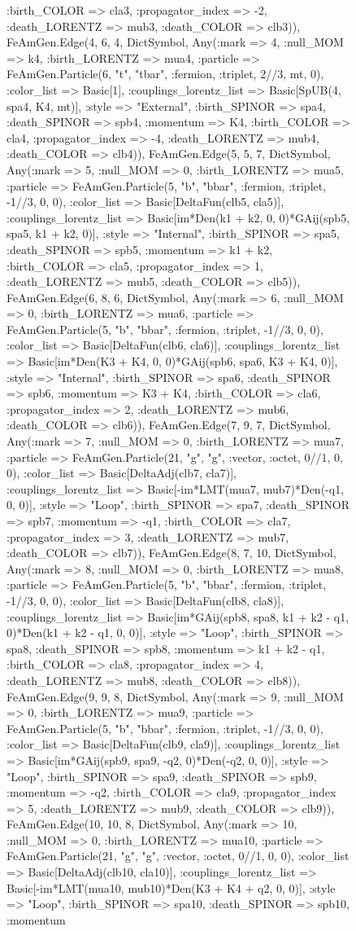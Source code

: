 \documentclass{revtex4}
\begin{document}
\begin{figure}[!htb]
\begin{center}
{:birth_COLOR => cla3, :propagator_index => -2, :death_LORENTZ => mub3, :death_COLOR => clb3)), FeAmGen.Edge(4, 6, 4, Dict{Symbol, Any}(:mark => 4, :null_MOM => k4, :birth_LORENTZ => mua4, :particle => FeAmGen.Particle(6, "t", "tbar", :fermion, :triplet, 2//3, mt, 0), :color_list => Basic[1], :couplings_lorentz_list => Basic[SpUB(4, spa4, K4, mt)], :style => "External", :birth_SPINOR => spa4, :death_SPINOR => spb4, :momentum => K4, :birth_COLOR => cla4, :propagator_index => -4, :death_LORENTZ => mub4, :death_COLOR => clb4)), FeAmGen.Edge(5, 5, 7, Dict{Symbol, Any}(:mark => 5, :null_MOM => 0, :birth_LORENTZ => mua5, :particle => FeAmGen.Particle(5, "b", "bbar", :fermion, :triplet, -1//3, 0, 0), :color_list => Basic[DeltaFun(clb5, cla5)], :couplings_lorentz_list => Basic[im*Den(k1 + k2, 0, 0)*GAij(spb5, spa5, k1 + k2, 0)], :style => "Internal", :birth_SPINOR => spa5, :death_SPINOR => spb5, :momentum => k1 + k2, :birth_COLOR => cla5, :propagator_index => 1, :death_LORENTZ => mub5, :death_COLOR => clb5)), FeAmGen.Edge(6, 8, 6, Dict{Symbol, Any}(:mark => 6, :null_MOM => 0, :birth_LORENTZ => mua6, :particle => FeAmGen.Particle(5, "b", "bbar", :fermion, :triplet, -1//3, 0, 0), :color_list => Basic[DeltaFun(clb6, cla6)], :couplings_lorentz_list => Basic[im*Den(K3 + K4, 0, 0)*GAij(spb6, spa6, K3 + K4, 0)], :style => "Internal", :birth_SPINOR => spa6, :death_SPINOR => spb6, :momentum => K3 + K4, :birth_COLOR => cla6, :propagator_index => 2, :death_LORENTZ => mub6, :death_COLOR => clb6)), FeAmGen.Edge(7, 9, 7, Dict{Symbol, Any}(:mark => 7, :null_MOM => 0, :birth_LORENTZ => mua7, :particle => FeAmGen.Particle(21, "g", "g", :vector, :octet, 0//1, 0, 0), :color_list => Basic[DeltaAdj(clb7, cla7)], :couplings_lorentz_list => Basic[-im*LMT(mua7, mub7)*Den(-q1, 0, 0)], :style => "Loop", :birth_SPINOR => spa7, :death_SPINOR => spb7, :momentum => -q1, :birth_COLOR => cla7, :propagator_index => 3, :death_LORENTZ => mub7, :death_COLOR => clb7)), FeAmGen.Edge(8, 7, 10, Dict{Symbol, Any}(:mark => 8, :null_MOM => 0, :birth_LORENTZ => mua8, :particle => FeAmGen.Particle(5, "b", "bbar", :fermion, :triplet, -1//3, 0, 0), :color_list => Basic[DeltaFun(clb8, cla8)], :couplings_lorentz_list => Basic[im*GAij(spb8, spa8, k1 + k2 - q1, 0)*Den(k1 + k2 - q1, 0, 0)], :style => "Loop", :birth_SPINOR => spa8, :death_SPINOR => spb8, :momentum => k1 + k2 - q1, :birth_COLOR => cla8, :propagator_index => 4, :death_LORENTZ => mub8, :death_COLOR => clb8)), FeAmGen.Edge(9, 9, 8, Dict{Symbol, Any}(:mark => 9, :null_MOM => 0, :birth_LORENTZ => mua9, :particle => FeAmGen.Particle(5, "b", "bbar", :fermion, :triplet, -1//3, 0, 0), :color_list => Basic[DeltaFun(clb9, cla9)], :couplings_lorentz_list => Basic[im*GAij(spb9, spa9, -q2, 0)*Den(-q2, 0, 0)], :style => "Loop", :birth_SPINOR => spa9, :death_SPINOR => spb9, :momentum => -q2, :birth_COLOR => cla9, :propagator_index => 5, :death_LORENTZ => mub9, :death_COLOR => clb9)), FeAmGen.Edge(10, 10, 8, Dict{Symbol, Any}(:mark => 10, :null_MOM => 0, :birth_LORENTZ => mua10, :particle => FeAmGen.Particle(21, "g", "g", :vector, :octet, 0//1, 0, 0), :color_list => Basic[DeltaAdj(clb10, cla10)], :couplings_lorentz_list => Basic[-im*LMT(mua10, mub10)*Den(K3 + K4 + q2, 0, 0)], :style => "Loop", :birth_SPINOR => spa10, :death_SPINOR => spb10, :momentum }
\end{center}
\end{figure}
\end{document}
